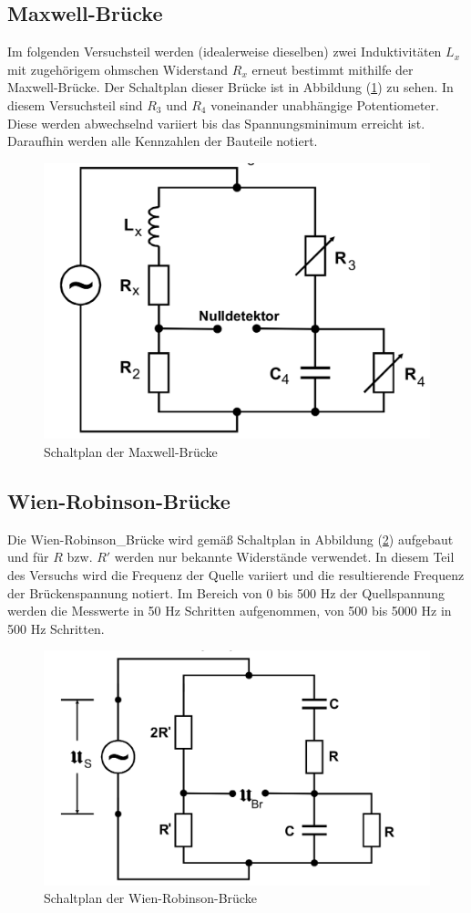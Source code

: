 \subsection{Maxwell-Brücke}
Im folgenden Versuchsteil werden (idealerweise dieselben) zwei Induktivitäten $L_x$ mit zugehörigem ohmschen Widerstand $R_x$ erneut bestimmt mithilfe der 
Maxwell-Brücke. Der Schaltplan dieser Brücke ist in Abbildung (\ref{pic:Maxwell-Bruecke}) zu sehen. In diesem Versuchsteil sind $R_3$ und $R_4$ voneinander unabhängige
Potentiometer. Diese werden abwechselnd variiert bis das Spannungsminimum erreicht ist. Daraufhin werden alle Kennzahlen der Bauteile notiert. 
\begin{figure}[H]
    \centering
    \includegraphics[width=0.4\linewidth]{Maxwell_Bruecke.png}
    \caption{Schaltplan der Maxwell-Brücke}
    \label{pic:Maxwell-Bruecke}
\end{figure} 
\subsection{Wien-Robinson-Brücke}
Die Wien-Robinson_Brücke wird gemäß Schaltplan in Abbildung (\ref{pic:Wien_Robinson_Bruecke}) aufgebaut und für $R$ bzw. $R'$ werden nur bekannte Widerstände verwendet.
In diesem Teil des Versuchs wird die Frequenz der Quelle variiert und die resultierende Frequenz der Brückenspannung notiert. Im Bereich von 0 bis 500 Hz der Quellspannung 
werden die Messwerte in 50 Hz Schritten aufgenommen, von 500 bis 5000 Hz in 500 Hz Schritten. 
\begin{figure}[H]
    \centering
    \includegraphics[width=0.4\linewidth]{Wienrobinson_Bruecke.png}
    \caption{Schaltplan der Wien-Robinson-Brücke}
    \label{pic:Wien_Robinson_Bruecke}
\end{figure} 
